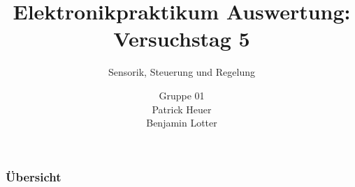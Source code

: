 \documentclass{beamer}
\title{Elektronikpraktikum Auswertung: Versuchstag 5}
\subtitle{Sensorik, Steuerung und Regelung}
\author{Gruppe 01 \\ Patrick Heuer \\ Benjamin Lotter}
\date{}
\begin{document}
\maketitle
\begin{frame}
    \frametitle{Übersicht}
    \tableofcontents
\end{frame}



    
\end{document}
